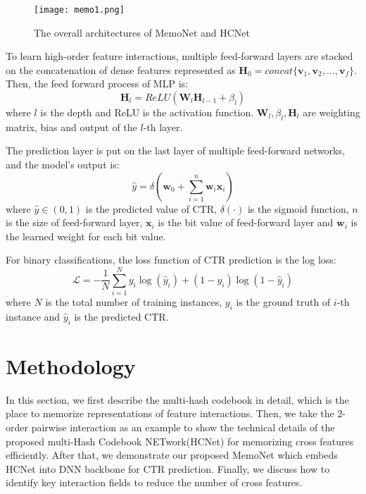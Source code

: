 \documentclass[sigconf,authorversion]{acmart}
\begin{document}
\begin{figure*}[h]
  \centering
  \texttt{[image: memo1.png]}
  \caption{The overall architectures of MemoNet and HCNet}
  \Description{}
\end{figure*}


To learn high-order feature interactions, multiple feed-forward layers are stacked on the concatenation of dense features represented as $\mathbf{H}_0 = concat\{\mathbf{v}_{1},\mathbf{v}_{2},...,\mathbf{v}_{f}\}$. Then, the feed forward process of MLP is:
\begin{equation}
  \mathbf{H}_l = ReLU(\mathbf{W}_l\mathbf{H}_{l-1} + \beta_l)
\end{equation}
where $l$ is the depth and ReLU is the activation function. $\mathbf{W}_l, \beta_l, \mathbf{H}_l$ are weighting matrix, bias and output of the $l$-th layer. 

The prediction layer is put on the last layer of multiple feed-forward networks, and the model’s output is:
\begin{equation}
  \hat{y} = \delta(\mathbf{w}_0 + \sum^n_{i=1}\mathbf{w}_i\mathbf{x}_i)
\end{equation}
where $\hat{y} \in (0, 1)$ is the predicted value of CTR, $\delta\left(\cdot\right)$ is the sigmoid function, $n$ is the size of feed-forward layer, $\mathbf{x}_i$ is the bit value of feed-forward layer and $\mathbf{w}_i$ is the learned weight for each bit value.

For binary classifications, the loss function of CTR prediction is the log loss:
\begin{equation}
  \mathcal{L} = -\frac{1}{N}\sum^N_{i=1}y_i\log(\hat{y}_i)+(1-y_i)\log(1-\hat{y}_i) 
\end{equation}
where $N$ is the total number of training instances, $y_i$ is the ground truth of $i$-th instance and $\hat{y}_i$ is the predicted CTR.  

\section{Methodology}
In this section, we first describe the multi-hash codebook in detail, which is the place to memorize representations of feature interactions. Then, we take the 2-order pairwise interaction as an example to show the technical details of
the proposed multi-Hash Codebook NETwork(HCNet) for memorizing  cross features efficiently. After that, we demonstrate our proposed MemoNet which embeds HCNet into DNN backbone for CTR prediction. Finally, we discuss how to identify key interaction fields to reduce the number of cross features.
\end{document}

